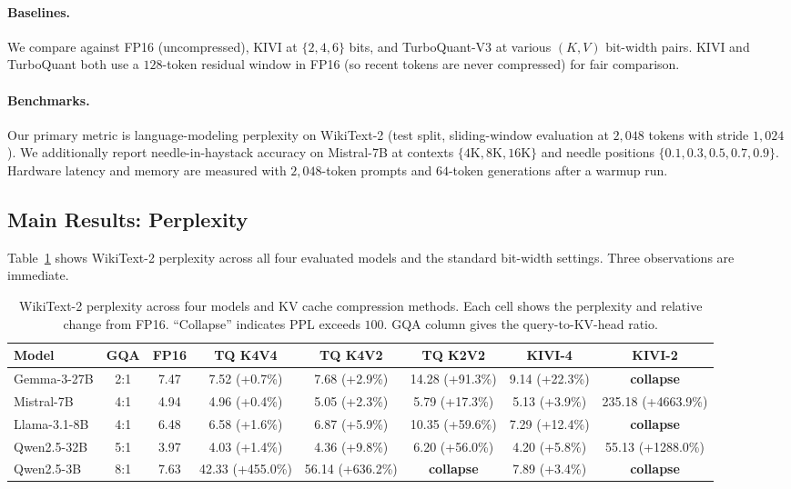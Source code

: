 \documentclass[11pt]{article}
\begin{document}
\paragraph{Baselines.} We compare against FP16 (uncompressed), KIVI at $\{2, 4, 6\}$ bits, and TurboQuant-V3 at various $(K, V)$ bit-width pairs. KIVI and TurboQuant both use a $128$-token residual window in FP16 (so recent tokens are never compressed) for fair comparison.

\paragraph{Benchmarks.} Our primary metric is language-modeling perplexity on WikiText-2 (test split, sliding-window evaluation at $2{,}048$ tokens with stride $1{,}024$). We additionally report needle-in-haystack accuracy on Mistral-7B at contexts $\{4\mathrm{K}, 8\mathrm{K}, 16\mathrm{K}\}$ and needle positions $\{0.1, 0.3, 0.5, 0.7, 0.9\}$. Hardware latency and memory are measured with $2{,}048$-token prompts and $64$-token generations after a warmup run.

\subsection{Main Results: Perplexity}
\label{sec:main-ppl}

Table~\ref{tab:main-ppl} shows WikiText-2 perplexity across all four evaluated models and the standard bit-width settings. Three observations are immediate.

\begin{table}[t]
\centering
\caption{WikiText-2 perplexity across four models and KV cache compression methods. Each cell shows the perplexity and relative change from FP16. ``Collapse'' indicates PPL exceeds $100$. GQA column gives the query-to-KV-head ratio.}
\label{tab:main-ppl}
\small
\begin{tabular}{l c c c c c c c}
\toprule
Model & GQA & FP16 & TQ K4V4 & TQ K4V2 & TQ K2V2 & KIVI-4 & KIVI-2 \\
\midrule
Gemma-3-27B & 2:1 & 7.47 & 7.52 {\small(+0.7\%)} & 7.68 {\small(+2.9\%)} & 14.28 {\small(+91.3\%)} & 9.14 {\small(+22.3\%)} & \textbf{collapse} \\
Mistral-7B & 4:1 & 4.94 & 4.96 {\small(+0.4\%)} & 5.05 {\small(+2.3\%)} & 5.79 {\small(+17.3\%)} & 5.13 {\small(+3.9\%)} & 235.18 {\small(+4663.9\%)} \\
Llama-3.1-8B & 4:1 & 6.48 & 6.58 {\small(+1.6\%)} & 6.87 {\small(+5.9\%)} & 10.35 {\small(+59.6\%)} & 7.29 {\small(+12.4\%)} & \textbf{collapse} \\
Qwen2.5-32B & 5:1 & 3.97 & 4.03 {\small(+1.4\%)} & 4.36 {\small(+9.8\%)} & 6.20 {\small(+56.0\%)} & 4.20 {\small(+5.8\%)} & 55.13 {\small(+1288.0\%)} \\
Qwen2.5-3B & 8:1 & 7.63 & 42.33 {\small(+455.0\%)} & 56.14 {\small(+636.2\%)} & \textbf{collapse} & 7.89 {\small(+3.4\%)} & \textbf{collapse} \\
\bottomrule
\end{tabular}
\end{table}
\end{document}
